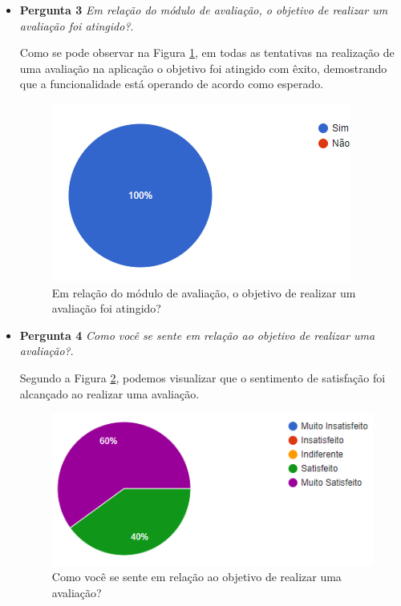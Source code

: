 \documentclass[12pt, a4paper]{report}
\begin{document}
\begin{itemize}
\item{\textbf{ Pergunta 3}}
\textit{Em relação do módulo de avaliação, o objetivo de realizar um avaliação foi atingido?}.

Como se pode observar na Figura \ref{fig:grafico_pergunta3}, em todas as tentativas na realização de uma avaliação na aplicação o objetivo foi atingido com êxito, demostrando que a funcionalidade está operando de acordo como esperado.  

\begin{figure}
\centering
\includegraphics[scale=0.8]{grafico_pergunta3.png}
\caption{Em relação do módulo de avaliação, o objetivo de realizar um avaliação foi atingido?}
\label{fig:grafico_pergunta3}
\end{figure}

\item{\textbf{ Pergunta 4}}
\textit{Como você se sente em relação ao objetivo de realizar uma avaliação?}.


Segundo a Figura \ref{fig:grafico_pergunta4}, podemos visualizar que o sentimento de satisfação foi alcançado ao realizar uma avaliação.

\begin{figure}
\centering
\includegraphics[scale=0.8]{grafico_pergunta4.png}
\caption{Como você se sente em relação ao objetivo de realizar uma avaliação?}
\label{fig:grafico_pergunta4}
\end{figure}


\end{itemize}
\end{document}
